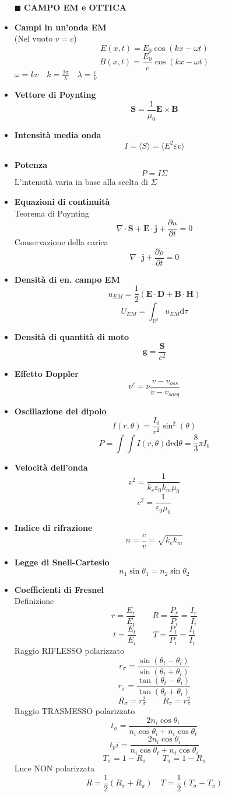 \documentclass{book}
\newcommand{\g}{\textbf}
\newcommand{\h}{\mathbf}
\newcommand{\e}{\begin{equation}}
\newcommand{\ex}{\end{equation} }
\renewcommand{\it}{\item[$\cdot$]}
\begin{document}
\begin{multicols}{4}
\begin{itemize}
\hline
\item [$\blacksquare$] \g{CAMPO EM e OTTICA}
    \it \g{Campi in un'onda EM} \\
        (Nel vuoto $v=c$)
        \e{E(x,t)=E_0\cos(kx-\omega t)} \ex
        \e{B(x,t)=\frac{E_0}{v}\cos(kx-\omega t)} \ex
        $\omega=kv \quad k=\frac{2\pi}{\lambda} \quad \lambda=\frac{v}{\nu}$ \\
    \it \g{Vettore di Poynting}
        \e{\h{S}=\frac{1}{\mu_0}\h{E}\times\h{B}} \ex
    \it \g{Intensità media onda}
        \e{I=\langle S\rangle=\langle E^2\varepsilon v\rangle} \ex
    \it \g{Potenza}
        \e{P=I\Sigma} \ex
        L'intensità varia in base alla scelta di $\Sigma$ 
    \it \g{Equazioni di continuità} \\
        Teorema di Poynting
        \e{\nabla\cdot \h{S}+\h{E}\cdot\h{j}+\frac{\partial u}{\partial t}=0 } \ex
        Conservazione della carica
        \e{\nabla\cdot\h{j}+\frac{\partial \rho}{\partial t}=0} \ex
    \it \g{Densità di en. campo EM}
        \e{u_{EM}=\frac{1}{2}(\h{E}\cdot\h{D}+\h{B}\cdot\h{H})} \ex
        \e{U_{EM}=\int_{\mathbb{R}^3}u_{EM} \mathrm{d}\tau} \ex
    \it \g{Densità di quantità di moto}
        \e{\h{g}=\frac{\h{S}}{c^2}} \ex
    \it \g{Effetto Doppler}
        \e{\nu'=\nu\frac{v-v_{oss}}{v-v_{sorg}}} \ex
    \it \g{Oscillazione del dipolo}
        \e{I(r,\theta)=\frac{I_0}{r^2}\sin^2(\theta)} \ex
        \e{P=\int \int I(r,\theta) \mathrm{d}r \mathrm{d}\theta=\frac{8}{3}\pi I_0}\ex
    \it \g{Velocità dell'onda}
        \e{v^2=\frac{1}{k_e \varepsilon_0 k_m \mu_0}} \ex
        \e{c^2=\frac{1}{\varepsilon_0 \mu_0}} \ex
    \it \g{Indice di rifrazione}
        \e{n=\frac{c}{v}=\sqrt{k_ek_m}} \ex
    \it \g{Legge di Snell-Cartesio}
        \e{n_1 \sin\theta_1=n_2 \sin\theta_2} \ex
    \it \g{Coefficienti di Fresnel} \\
        Definizione
        \e{r=\frac{E_r}{E_i} \qquad R=\frac{P_r}{P_i}=\frac{I_r}{I_i}} \ex
        \e{t=\frac{E_t}{E_i} \qquad T=\frac{P_t}{P_i}=\frac{I_t}{I_i}} \ex
        Raggio RIFLESSO polarizzato
        \e{r_\sigma=\frac{\sin(\theta_t-\theta_i)}{\sin(\theta_t+\theta_i)}} \ex
        \e{r_\pi=\frac{\tan(\theta_t-\theta_i)}{\tan(\theta_t+\theta_i)}} \ex
        \e{R_\sigma=r_\sigma^2 \qquad R_\pi=r_\pi^2} \ex
        Raggio TRASMESSO polarizzato
        \e{t_\sigma=\frac{2n_i\cos\theta_i}{n_i\cos\theta_i+n_t\cos\theta_t}} \ex
        \e{t_pi=\frac{2n_i\cos\theta_i}{n_i\cos\theta_t+n_t\cos\theta_i}} \ex
        \e{T_\sigma=1-R_\sigma \qquad T_\pi=1-R_\pi} \ex
        Luce NON polarizzata
        \e{R=\frac{1}{2}(R_\sigma+R_\pi) \quad T=\frac{1}{2}(T_\sigma+T_\pi)} \ex

\end{itemize}
\end{multicols}
\end{document}
